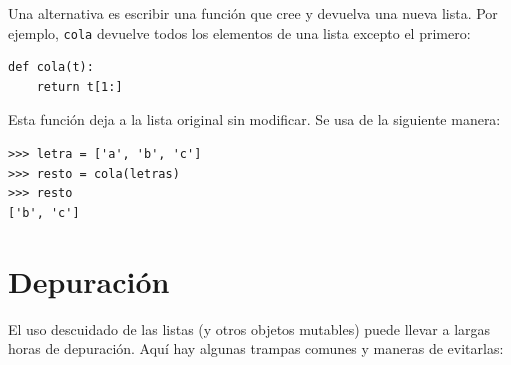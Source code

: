 \documentclass[10pt]{book}
\begin{document}
Una alternativa es escribir una función que cree y
devuelva una nueva lista.  Por
ejemplo, {\tt cola} devuelve todos los elementos
de una lista excepto el primero:

\begin{verbatim}
def cola(t):
    return t[1:]
\end{verbatim}
%
Esta función deja a la lista original sin modificar.
Se usa de la siguiente manera:

\begin{verbatim}
>>> letra = ['a', 'b', 'c']
>>> resto = cola(letras)
>>> resto
['b', 'c']
\end{verbatim}



\section{Depuración}

El uso descuidado de las listas (y otros objetos mutables)
puede llevar a largas horas de depuración.  Aquí hay algunas
trampas comunes y maneras de evitarlas:
\end{document}
